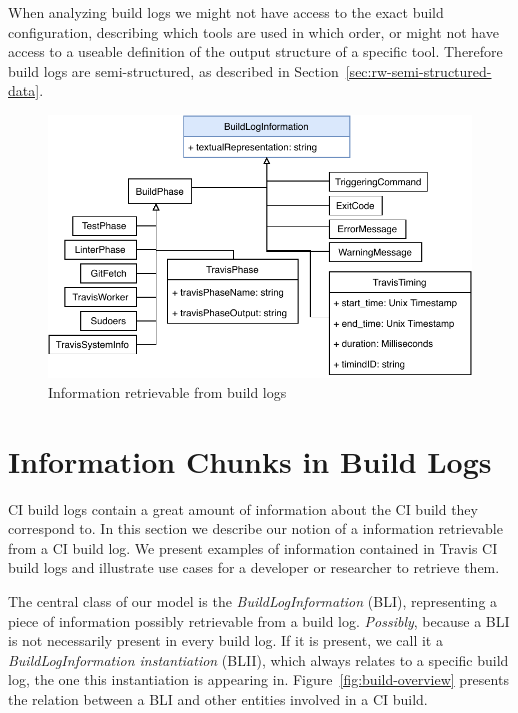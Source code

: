 \documentclass[\myrootdir/main.tex]{subfiles}
\begin{document}
When analyzing build logs we might not have access to the exact build configuration, describing which tools are used in which order, or might not have access to a useable definition of the output structure of a specific tool.
Therefore build logs are semi-structured, as described in Section~\ref{sec:rw-semi-structured-data}.


\begin{figure}[htbp]
	\centering
	\includegraphics[width=\textwidth, clip]{img/build-log-information.pdf}
	\caption{Information retrievable from build logs}
	\label{fig:build-log-information}
\end{figure}

\section{Information Chunks in Build Logs}
\label{sec:bli}
CI build logs contain a great amount of information about the CI build they correspond to.
In this section we describe our notion of a information retrievable from a CI build log.
We present examples of information contained in Travis CI build logs and illustrate use cases for a developer or researcher to retrieve them.

The central class of our model is the \emph{BuildLogInformation} (BLI), representing a piece of information possibly retrievable from a build log.
\emph{Possibly}, because a BLI is not necessarily present in every build log.
If it is present, we call it a \emph{BuildLogInformation instantiation} (BLII), which always relates to a specific build log, the one this instantiation is appearing in.
Figure~\ref{fig:build-overview} presents the relation between a BLI and other entities involved in a CI build.
\end{document}
